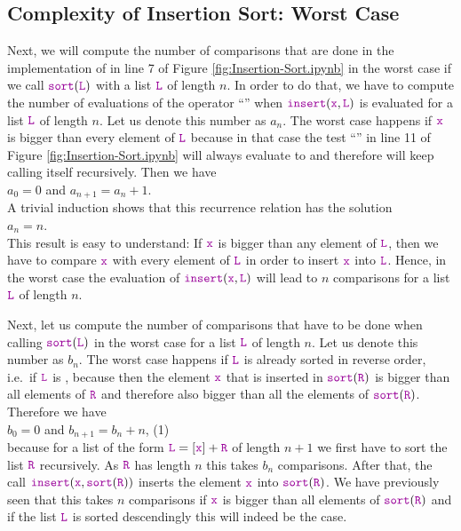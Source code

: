 \subsection{Complexity of Insertion Sort: Worst Case}
Next, we will compute the number of comparisons that are done in the implementation of 
in line 7 of Figure \ref{fig:Insertion-Sort.ipynb} in the worst case if we call $\mytt{sort}(\mytt{L})$ with a list
$\mytt{L}$ of length $n$. In order to do that, 
we have to compute the number of evaluations of the operator ``\mytt{<=}'' when 
 $\mytt{insert}(\mytt{x},\mytt{L})$ is evaluated for a list $\mytt{L}$ of length $n$.  Let us denote this number as 
$a_n$.  The worst case happens if $\mytt{x}$ is bigger than every element of $\mytt{L}$ because in that case the
test ``'' in line 11 of Figure \ref{fig:Insertion-Sort.ipynb} will always evaluate to
 and therefore  will keep calling itself recursively.
Then we have
\\[0.2cm]
\hspace*{1.3cm}
$a_0 = 0$ \quad and \quad $a_{n+1} = a_n + 1$. 
\\[0.2cm]
A trivial induction shows that this recurrence relation has the solution
\\[0.2cm]
\hspace*{1.3cm} 
$a_n = n$.
\\[0.2cm]
This result is easy to understand:  If $\mytt{x}$ is bigger than any element of $\mytt{L}$, then we have to
compare $\mytt{x}$ with every element of $\mytt{L}$ in order to insert $\mytt{x}$ into $\mytt{L}$.
Hence, in the worst case the evaluation of $\mytt{insert}(\mytt{x},\mytt{L})$ will lead to $n$ comparisons for a list $\mytt{L}$ of length $n$.

Next, let us compute the number of comparisons that have to be done when calling
$\mytt{sort}(\mytt{L})$ in the worst case for a list  $\mytt{L}$ of length $n$.  Let us denote this number as
$b_n$. The worst case happens if $\mytt{L}$ is already sorted in reverse order, i.e.~if $\mytt{L}$ is
, because then the element $\mytt{x}$ that is inserted in
$\mytt{sort}(\mytt{R})$ is bigger than all elements 
of $\mytt{R}$ and therefore also bigger than all the elements of $\mytt{sort}(\mytt{R})$.  Therefore we have \\[0.2cm]
\hspace*{1.3cm}
 $b_0 = 0$ \quad and \quad $b_{n+1} = b_n + n$, \hspace*{\fill} (1)
\\[0.2cm]
because for a list of the form $\mytt{L} = [\mytt{x}] + \mytt{R}$ of length $n+1$ we first have to sort the list $\mytt{R}$
recursively.  As $\mytt{R}$ has length $n$ this takes $b_n$ comparisons.  After that, the call
$\mytt{insert}(\mytt{x}, \mytt{sort}(\mytt{R}))$ 
inserts the element $\mytt{x}$ into $\mytt{sort}(\mytt{R})$.  We have previously seen that this takes $n$
comparisons if $\mytt{x}$ is bigger than all elements of $\mytt{sort}(\mytt{R})$ and if the list $\mytt{L}$ is sorted
descendingly this will indeed be the case.

